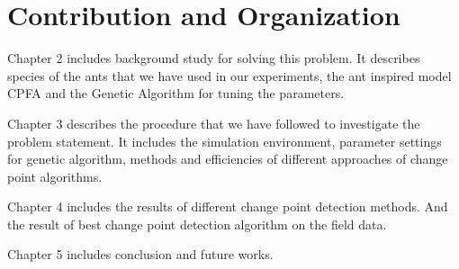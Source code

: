 \section{\label{section:Contribution and Organization}Contribution and Organization}
Chapter 2 includes background study for solving this problem. It describes species of the ants that we have used in our experiments, the ant inspired model CPFA and the Genetic Algorithm for tuning the parameters.\par
Chapter 3 describes the procedure that we have followed to investigate the problem statement. It includes the simulation environment, parameter settings for genetic algorithm, methods and efficiencies of different approaches of change point algorithms. \par
Chapter 4 includes the results of different change point detection methods. And the result of best change point detection algorithm on the field data. \par
Chapter 5 includes conclusion and future works. 

